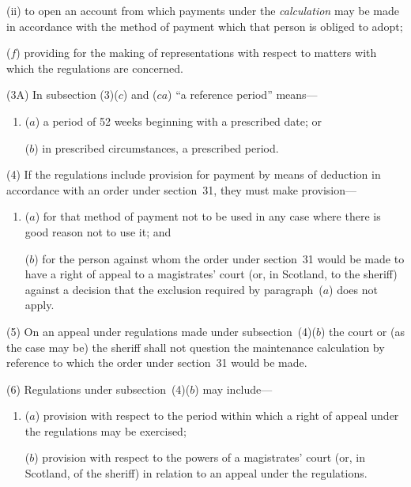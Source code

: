 \documentclass[12pt,a4paper]{article}
\begin{document}
\begin{enumerate}
\begin{enumerate}
(ii) to open an account from which payments under the 
\emph{calculation}  %
may be made in accordance with the method of payment which that person is obliged to adopt;
\end{enumerate}

($f$) providing for the making of representations with respect to matters with which the regulations are concerned.
\end{enumerate}

(3A) In subsection (3)($c$) and ($ca$) “a reference period” means—
\begin{enumerate}\item[]
($a$) a period of 52 weeks beginning with a prescribed date; or

($b$) in prescribed circumstances, a prescribed period.
\end{enumerate}

(4) If the regulations include provision for payment by means of deduction in accordance with an order under section~31, they must make provision—
\begin{enumerate}\item[]
($a$) for that method of payment not to be used in any case where there is good reason not to use it; and

($b$) for the person against whom the order under section~31 would be made to have a right of appeal to a magistrates' court (or, in Scotland, to the sheriff) against a decision that the exclusion required by paragraph~($a$) does not apply.
\end{enumerate}

\begin{sloppypar}
(5) On an appeal under regulations made under subsection~(4)($b$) the court or (as the case may be) the sheriff shall not question the maintenance calculation by reference to which the order under section~31 would be made.
\end{sloppypar}

(6) Regulations under subsection~(4)($b$) may include—
\begin{enumerate}\item[]
($a$) provision with respect to the period within which a right of appeal under the regulations may be exercised;

($b$) provision with respect to the powers of a magistrates' court (or, in Scotland, of the sheriff) in relation to an appeal under the regulations.
\end{enumerate}
\end{document}
